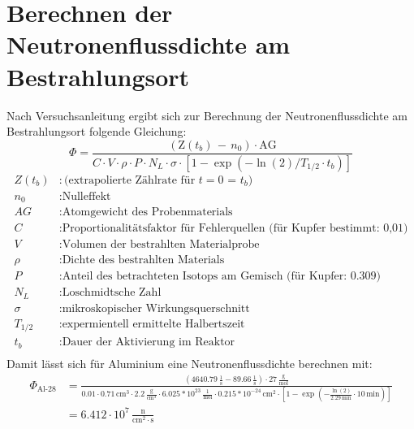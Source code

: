 \documentclass[12pt,german]{article}
\begin{document}
    \section{Berechnen der Neutronenflussdichte am Bestrahlungsort}
    Nach Versuchsanleitung ergibt sich zur Berechnung der Neutronenflussdichte am Bestrahlungsort folgende Gleichung:
    \begin{equation*}
        \Phi = \frac{\left(\text{Z}(t_b)\, -\, n_0\right) \cdot \text{AG}}{C \cdot V \cdot \rho \cdot P \cdot N_L \cdot \sigma \cdot \left[1 - \exp(-\ln(2)/T_{1/2} \cdot t_b)\right]}
    \end{equation*}
    \begin{align*}
        Z(t_b) &: \text{(extrapolierte Zählrate für $t = 0$ = $t_b$)} \\
        n_0 &: \text{Nulleffekt} \\
        AG &: \text{Atomgewicht des Probenmaterials} \\
        C &: \text{Proportionalitätsfaktor für Fehlerquellen (für Kupfer bestimmt: 0,01)} \\
        V &: \text{Volumen der bestrahlten Materialprobe} \\
        \rho &: \text{Dichte des bestrahlten Materials} \\
        P &: \text{Anteil des betrachteten Isotops am Gemisch (für Kupfer: 0.309)} \\
        N_L &: \text{Loschmidtsche Zahl} \\
        \sigma &: \text{mikroskopischer Wirkungsquerschnitt} \\
        T_{1/2} &: \text{expermientell ermittelte Halbertszeit} \\
        t_b &: \text{Dauer der Aktivierung im Reaktor} \\
    \end{align*}
    Damit lässt sich für Aluminium eine Neutronenflussdichte berechnen mit:
    \begin{align*}
        \Phi_{\text{Al-28}} &= \frac{\left(4640.79\, \frac{1}{\text{s}} - 89.66\, \frac{1}{\text{s}}\right) \cdot 27\, \frac{\text{g}}{\text{mol}}}{0.01 \cdot 0.71\, \text{cm}^3 \cdot 2.2\, \frac{\text{g}}{\text{cm}^3} \cdot 6.025 * 10^{23}\, \frac{1}{\text{mol}} \cdot 0.215 * 10^{-24}\, \text{cm}^2 \cdot \left[1 - \exp\left(- \frac{\ln(2)}{2.29\, \text{min}} \cdot 10\, \text{min}\right)\right]} \\
            &= 6.412 \cdot 10^7\, \frac{\text{n}}{\text{cm}^2 \cdot \text{s}}
    \end{align*}
\end{document}
